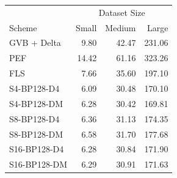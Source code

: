 \begin{tabular}{lrrr}
\toprule
 & \multicolumn{3}{c}{Dataset Size} \\
Scheme & Small & Medium & Large \\
\midrule
GVB + Delta & 9.80 & 42.47 & 231.06 \\
PEF & 14.42 & 61.16 & 323.26 \\
FLS & 7.66 & 35.60 & 197.10 \\
S4-BP128-D4 & 6.09 & 30.48 & 170.10 \\
S4-BP128-DM & 6.28 & 30.42 & 169.81 \\
S8-BP128-D4 & 6.36 & 31.13 & 174.35 \\
S8-BP128-DM & 6.58 & 31.70 & 177.68 \\
S16-BP128-D4 & 6.28 & 30.84 & 171.90 \\
S16-BP128-DM & 6.29 & 30.91 & 171.63 \\
\bottomrule
\end{tabular}
